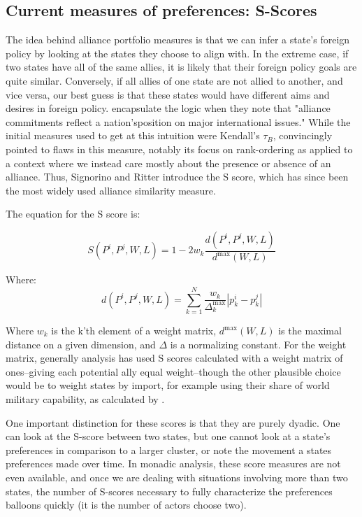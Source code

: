 \subsection{Current measures of preferences: S-Scores}
The idea behind alliance portfolio measures is that we can infer a state's foreign policy by looking at the states they choose to align with. In the extreme case, if two states have all of the same allies, it is likely that their foreign policy goals are quite similar. Conversely, if all allies of one state are not allied to another, and vice versa, our best guess is that these states would have different aims and desires in foreign policy. \citet{altman:bdm:1979} encapsulate the logic when they note that "alliance commitments reflect a nation'sposition on major international issues." While the initial measures used to get at this intuition were Kendall's $\tau_{B}$, \citet{signorino:ritter:1999} convincingly pointed to flaws in this measure, notably its focus on rank-ordering as applied to a context where we instead care mostly about the presence or absence of an alliance. Thus, Signorino and Ritter introduce the S score, which has since been the most widely used alliance similarity measure.

The equation for the S score is:

\begin{equation}
S(P^i, P^j, W, L) = 1 - 2w_k \frac{d(P^i, P^j, W, L)}{d^{\text{max}}(W,L)}
\end{equation}

Where:
\begin{equation}
d(P^i, P^j, W, L) = \sum_{k = 1}^N \frac{w_k}{\Delta^\text{max}_{k}} |p^i_k - p^j_k|
\end{equation}

Where $w_k$ is the k'th element of a weight matrix, $d^\text{max}(W,L)$ is the maximal distance on a given dimension, and $\Delta$ is a normalizing constant. For the weight matrix, generally analysis has used S scores calculated with a weight matrix of ones--giving each potential ally equal weight--though the other plausible choice would be to weight states by import, for example using their share of world military capability, as calculated by \citet{cinc}.

One important distinction for these scores is that they are purely dyadic. One can look at the S-score between two states, but one cannot look at a state's preferences in comparison to a larger cluster, or note the movement a states preferences made over time. In monadic analysis, these score measures are not even available, and once we are dealing with situations involving more than two states, the number of S-scores necessary to fully characterize the preferences balloons quickly (it is the number of actors choose two).

